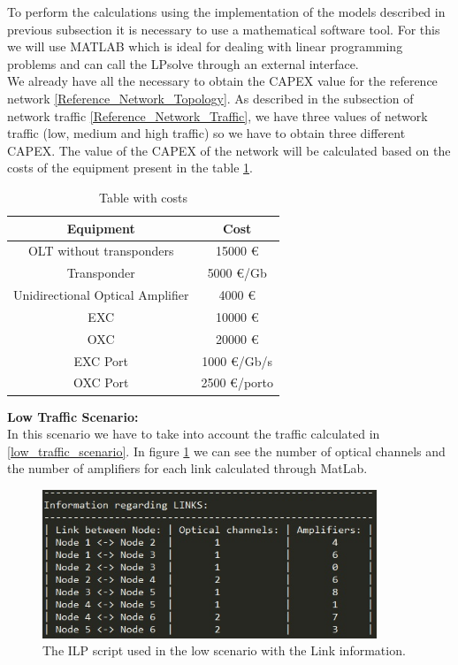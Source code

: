 To perform the calculations using the implementation of the models described in previous subsection it is necessary to use a mathematical software tool. For this we will use MATLAB which is ideal for dealing with linear programming problems and can call the LPsolve through an external interface.\\
We already have all the necessary to obtain the CAPEX value for the reference network \ref{Reference_Network_Topology}. As described in the subsection of network traffic \ref{Reference_Network_Traffic}, we have three values of network traffic (low, medium and high traffic) so we have to obtain three different CAPEX.
The value of the CAPEX of the network will be calculated based on the costs of the equipment present in the table \ref{table_cost_ilp}.
\newpage
\begin{table}[h!]
\centering
\begin{tabular}{|| c | c||}
 \hline
 Equipment & Cost \\
 \hline\hline
 OLT without transponders & 15000 \euro \\
 Transponder & 5000 \euro/Gb \\
 Unidirectional Optical Amplifier & 4000 \euro \\
 EXC & 10000 \euro \\
 OXC & 20000 \euro \\
 EXC Port & 1000 \euro /Gb/s\\
 OXC Port & 2500 \euro /porto \\
 \hline
\end{tabular}
\caption{Table with costs}
\label{table_cost_ilp}
\end{table}


\textbf{Low Traffic Scenario:}\\

In this scenario we have to take into account the traffic calculated in \ref{low_traffic_scenario}. In figure \ref{link_opaque_surv_ref_low} we can see the number of optical channels and the number of amplifiers for each link calculated through MatLab.\\
 
\begin{figure}[h!]
\centering
\includegraphics[width=10cm]{sdf/ilp/opaque_survivability/figures/link_opaque_surv_ref_low}
\caption{The ILP script used in the low scenario with the Link information.}
\label{link_opaque_surv_ref_low}
\end{figure}

